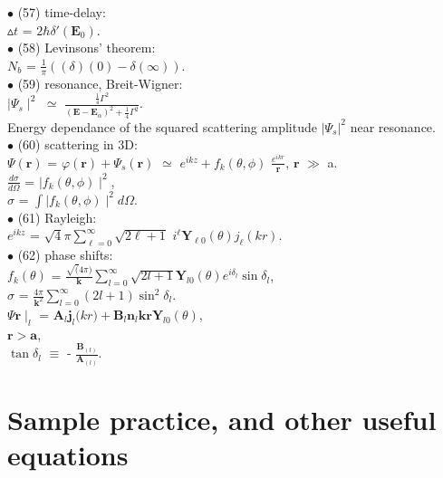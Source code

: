\documentclass[10pt,fancy]{elegantbook}
\begin{document}
{$\bullet$ (57) time-delay:  \\  
$\vartriangle t$ = $2\hbar \delta'( \mathbf E_0)$.  \\

$\bullet$ (58) Levinsons' theorem:  \\  
$\mathit N_b$ = $\frac{1}{\pi} ((\delta)(0) - \delta(\infty))$.  \\

$\bullet$ (59) resonance, Breit-Wigner:  \\  
$\mid \Psi_s \mid^2$ $\simeq$ $\frac{ \frac{1}{4} \Gamma^2} {(\mathbf E - \mathbf E_\alpha)^2 + \frac{1}{4} \Gamma^2}$.  \\

Energy dependance of the squared scattering amplitude $ |\Psi_s|^2$ near resonance.  \\

$\bullet$ (60) scattering in 3D:  \\  
$\Psi(\mathbf r)$ = $\varphi(\mathbf r) + \Psi_s(\mathbf r)$ $\simeq$ $e^{ikz} + f_k(\theta, \phi)$ $ \frac{e^{ikr}}{\mathbf r}$, $\mathbf r$ $\gg$ a. \\ 
$\frac{d \sigma}{d \Omega}$ = $\mid f_k(\theta, \phi) \mid^2$,  \\ 
$\sigma$ = $\int \mid f_k(\theta, \phi) \mid^2 d \Omega$.  \\

$\bullet$ (61) Rayleigh:  \\
$e^{ikz}$ = ${\sqrt 4 \pi} \sum_{\ell = 0}^\infty {\sqrt{2 \ell + 1}}$ $i^\ell \mathbf Y_{\ell 0}(\theta) j_\ell(kr)$.  \\

$\bullet$ (62) phase shifts: \\ 
$f_k(\theta)$ = $\frac{\sqrt(4 \pi)} {\mathbf k} \sum_{l = 0}^\infty \sqrt{2l + 1} \mathbf Y_{l 0}( \theta) e^{i \delta_l} \sin \delta_l$, \\   
$\sigma$ = $\frac{4 \pi}{\mathbf k^2} \sum_{l = 0}^\infty(2 l + 1) \sin^2 \delta_{l}$.  \\    
$\Psi \mathbf r \mid_l$ = $\mathbf A_{l} \mathbf j_{l} \mathbf(kr) + \mathbf B_{l} \mathbf n_{l} \mathbf{kr} \mathbf Y_{l 0} (\theta)$,  \\  
$\mathbf r > \mathbf a$,  \\    
$\tan \delta_{l}$ $\equiv$  - $\frac{\mathbf B_{(l)}}{\mathbf A_{(l)}}$.  \


\chapter{Sample practice, and other useful equations}

}
\end{document}
